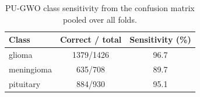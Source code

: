 \begin{table}[t]
\centering
\caption{PU-GWO class sensitivity from the confusion matrix pooled over all folds.}
\label{tab:table8_class_sensitivity}
\small
\begin{tabular}{lcc}
\toprule
Class & Correct / total & Sensitivity (\%) \\
\midrule
glioma & 1379/1426 & 96.7 \\
meningioma & 635/708 & 89.7 \\
pituitary & 884/930 & 95.1 \\
\bottomrule
\end{tabular}
\end{table}
